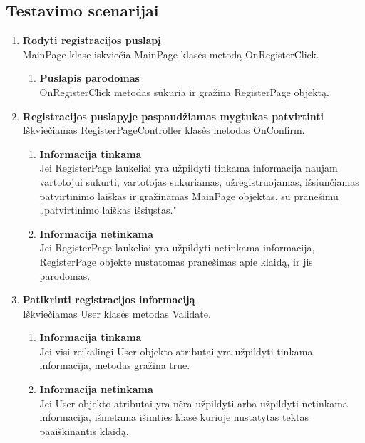\documentclass{VUMIFPSkursinis}
\begin{document}
	\subsection{Testavimo scenarijai}
		\begin{enumerate}[label=\textbf{T\arabic*}]
			\item \textbf{Rodyti registracijos puslapį}\\
				MainPage klase iskviečia MainPage klasės metodą OnRegisterClick.
				\begin{enumerate}[label*=\textbf{.\arabic*}]
					\item \textbf{Puslapis parodomas}\\
					 OnRegisterClick metodas sukuria ir gražina RegisterPage objektą.
				\end{enumerate}
			\item \textbf{Registracijos puslapyje paspaudžiamas mygtukas patvirtinti}\\
				Iškviečiamas RegisterPageController klasės metodas OnConfirm.
				\begin{enumerate}[label*=\textbf{.\arabic*}]
					\item \textbf{Informacija tinkama}\\
						Jei RegisterPage laukeliai yra užpildyti tinkama informacija naujam vartotojui sukurti,
						vartotojas sukuriamas, užregistruojamas, išsiunčiamas patvirtinimo laiškas ir gražinamas MainPage objektas, 
					su pranešimu „patvirtinimo laiškas išsiųstas."
					\item \textbf{Informacija netinkama}\\
						Jei RegisterPage laukeliai yra užpildyti netinkama informacija,
						RegisterPage objekte nustatomas pranešimas apie klaidą, ir jis parodomas.
				\end{enumerate}
			\item \textbf{Patikrinti registracijos informaciją}\\
				Iškviečiamas User klasės metodas Validate.
				\begin{enumerate}[label*=\textbf{.\arabic*}]
					\item \textbf{Informacija tinkama}\\
						Jei visi reikalingi User objekto atributai yra užpildyti tinkama informacija, 
						metodas gražina true.
					\item \textbf{Informacija netinkama}\\
						Jei User objekto atributai yra nėra užpildyti arba užpildyti netinkama informacija,
						išmetama išimties klasė kurioje nustatytas tektas paaiškinantis klaidą.

\end{enumerate}
\end{enumerate}
\end{document}
